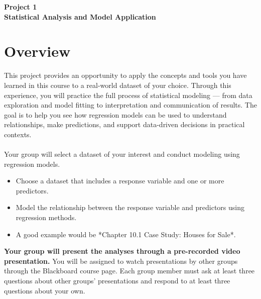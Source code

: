 \documentclass[12pt]{article}
\begin{document}
\begin{center}
\textbf{\Large Project 1 \\ Statistical Analysis and Model Application} \\
\end{center}


\section*{Overview}
This project provides an opportunity to apply the concepts and tools you have learned in this course to a real-world dataset of your choice. Through this experience, you will practice the full process of statistical modeling — from data exploration and model fitting to interpretation and communication of results. The goal is to help you see how regression models can be used to understand relationships, make predictions, and support data-driven decisions in practical contexts. \\ \\
Your group will select a dataset of your interest and conduct modeling using regression models.

\begin{itemize}
    \item Choose a dataset that includes a response variable and one or more predictors.
    \item Model the relationship between the response variable and predictors using regression methods.
    \item A good example would be *Chapter 10.1 Case Study: Houses for Sale*.
\end{itemize}

\textbf{Your group will present the analyses through a pre-recorded video presentation.}  
You will be assigned to watch presentations by other groups through the Blackboard course page.  
Each group member must ask at least three questions about other groups’ presentations and respond to at least three questions about your own.
\end{document}
